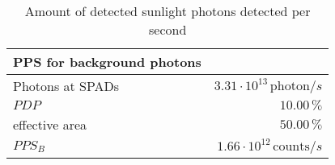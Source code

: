 \begin{table}[H]
\centering
\caption{Amount of detected sunlight photons detected per second}
\label{tab:PPS}
\begin{tabular}{|l|r|}\hline
    \textbf{PPS for background photons} & \\
    \hline 
    Photons at SPADs & $3.31\cdot10^{13}\,\text{photon}/s$ \\
    $PDP$ & $10.00\, \%$ \\
    effective area & $50.00\, \%$ \\
    $PPS_B$ & $1.66\cdot10^{12}\,\text{counts}/s$ \\
    \hline 
\end{tabular}
\end{table}
